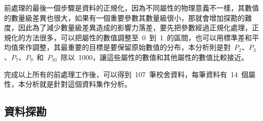 
前處理的最後一個步驟是資料的正規化，因為不同屬性的物理意義不一樣，其數值的數量級差異也很大，如果有一個重要參數其數量級很小，那就會增加探勘的難度，因此為了減少數量級差異造成的影響力落差，要先把參數經過正規化處理，正規化的方法很多，可以把屬性的數值調整至~0~到~1~的區間，也可以用標準差和平均值來作調整，其最重要的目標是要保留原始數值的分布，本分析則是對~$P_2$、$P_3$、$P_7$、$P_9$~和~$P_{10}$~除以~1000，讓這些屬性的數值和其他屬性的數值比較接近。


完成以上所有的前處理工作後，可以得到~107~筆校舍資料，每筆資料有~14~個屬性，本分析就是針對這個資料集作分析。


\subsection{資料探勘}

